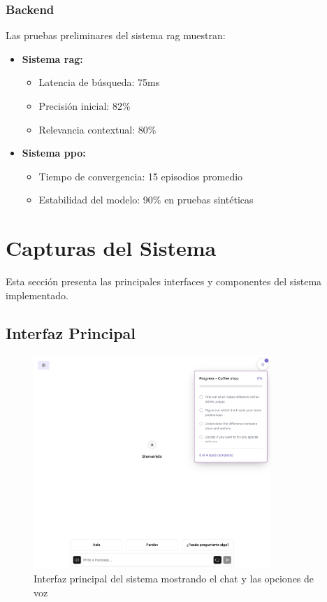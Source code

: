\subsubsection{Backend}

Las pruebas preliminares del sistema \gls{rag} muestran:

\begin{itemize}
    \item \textbf{Sistema \gls{rag}:}
    \begin{itemize}
        \item Latencia de búsqueda: 75ms
        \item Precisión inicial: 82\%
        \item Relevancia contextual: 80\%
    \end{itemize}

    \item \textbf{Sistema \gls{ppo}:}
    \begin{itemize}
        \item Tiempo de convergencia: 15 episodios promedio
        \item Estabilidad del modelo: 90\% en pruebas sintéticas
    \end{itemize}
\end{itemize}

\section{Capturas del Sistema}
\label{capturas-sistema}

Esta sección presenta las principales interfaces y componentes del sistema implementado.

\subsection{Interfaz Principal}
\label{interfaz-principal}

\begin{figure}[H]
    \centering
    \includegraphics[width=0.8\textwidth]{figuras/screenshots/chat-initial.png}
    \caption{Interfaz principal del sistema mostrando el chat y las opciones de voz}
    \label{fig:main-interface}
\end{figure}

